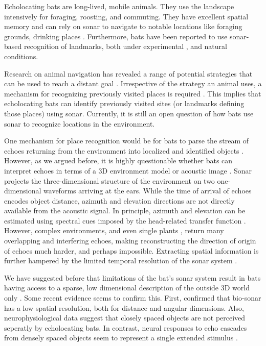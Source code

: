\documentclass[preprint,5p]{elsarticle}
\begin{document}
Echolocating bats are long-lived, mobile animals. They use the landscape intensively for foraging, roosting, and commuting. They have excellent spatial memory \citep{Barchi2013,VonHelversen2005} and can rely on sonar to navigate to notable locations like foraging grounds, drinking places \citep[see][for references]{Vanderelst2016,Vanderelst2017}. Furthermore, bats have been reported to use sonar-based recognition of landmarks, both under experimental \citep{Jensen2005,Yu2019}, and natural \citep{Verboom1999} conditions.

Research on animal navigation has revealed a range of potential strategies that can be used to reach a distant goal \citep[Reviewed by][]{Franz2000}. Irrespective of the strategy an animal uses, a mechanism for recognizing previously visited places is required \citep{Vanderelst2016,Vanderelst2017}. This implies that echolocating bats can identify previously visited sites (or landmarks defining those places) using sonar. Currently, it is still an open question of how bats use sonar to recognize locations in the environment.

One mechanism for place recognition would be for bats to parse the stream of echoes returning from the environment into localized and identified objects \citep{Lee2017,Barchi2013,Moss2001,Schnitzler2003,Simmons2012,Ulanovsky2008,Clare2015,Surlykke2016,Geipel2013}. However, as we argued before, it is highly questionable whether bats can interpret echoes in terms of a 3D environment model or acoustic image \citep[e.g.,][]{Vanderelst2015,Vanderelst2016,Steckel2013}. Sonar projects the three-dimensional structure of the environment on two one-dimensional waveforms arriving at the ears. While the time of arrival of echoes encodes object distance, azimuth and elevation directions are not directly available from the acoustic signal. In principle, azimuth and elevation can be estimated using spectral cues imposed by the head-related transfer function \citep[e.g.,][]{Reijniers2010,Aytekin2004}. However, complex environments, and even single plants \citep{Yovel2008,Muller2000}, return many overlapping and interfering echoes, making reconstructing the direction of origin of echoes much harder, and perhaps impossible. Extracting spatial information is further hampered by the limited temporal resolution of the sonar system \citep{Simmons1989,Wiegrebe1996,Surlykke1996}. 

We have suggested before that limitations of the bat's sonar system result in bats having access to a sparse, low dimensional description of the outside 3D world only \citep{Vanderelst2015a,Vanderelst2016}. Some recent evidence seems to confirm this. First, \citet{Geberl2019} confirmed that bio-sonar has a low spatial resolution, both for distance and angular dimensions. Also, neurophysiological data suggest that closely spaced objects are not perceived seperatly by echolocating bats. In contrast, neural responses to echo cascades from densely spaced objects seem to represent a single extended stimulus \citep{Warnecke2018,Knowles2015}.
\end{document}
